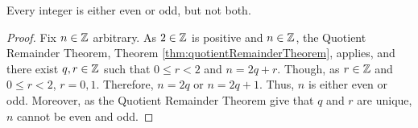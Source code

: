 \guard



\begin{prop}
\label{prop:integersAreEvenXorOdd}
  Every integer is either even or odd, but not both.
\end{prop}
\begin{proof}
  Fix $n\in\mathbb{Z}$ arbitrary.
  As $2\in\mathbb{Z}$ is positive and $n\in\mathbb{Z}$, the Quotient Remainder Theorem, Theorem \ref{thm:quotientRemainderTheorem}, applies, and there exist $q,r\in\mathbb{Z}$ such that $0\leq r<2$ and $n=2q+r$.
  Though, as $r\in\mathbb{Z}$ and $0\leq r<2$, $r=0,1$.
  Therefore, $n=2q$ or $n=2q+1$.
  Thus, $n$ is either even or odd.
  Moreover, as the Quotient Remainder Theorem  give that $q$ and $r$ are unique, $n$ cannot be even and odd.
\end{proof}
